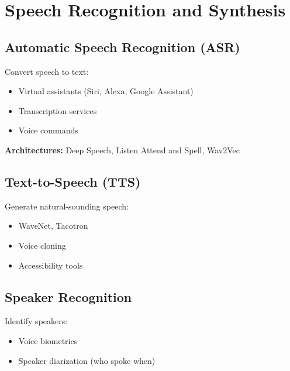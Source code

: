 
\section{Speech Recognition and Synthesis}
\label{sec:speech-applications}

\subsection{Automatic Speech Recognition (ASR)}

Convert speech to text:
\begin{itemize}
    \item Virtual assistants (Siri, Alexa, Google Assistant)
    \item Transcription services
    \item Voice commands
\end{itemize}

\textbf{Architectures:} Deep Speech, Listen Attend and Spell, Wav2Vec

\subsection{Text-to-Speech (TTS)}

Generate natural-sounding speech:
\begin{itemize}
    \item WaveNet, Tacotron
    \item Voice cloning
    \item Accessibility tools
\end{itemize}

\subsection{Speaker Recognition}

Identify speakers:
\begin{itemize}
    \item Voice biometrics
    \item Speaker diarization (who spoke when)
\end{itemize}

